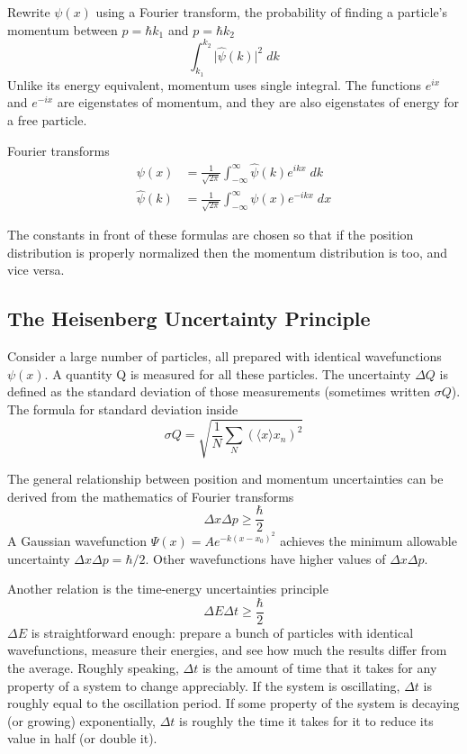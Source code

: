 \documentclass[../main.tex]{subfiles}
\begin{document}
Rewrite $\psi(x)$ using a Fourier transform, the probability of finding a particle's momentum between $p = \hbar k_1$ and $p = \hbar k_2$
\begin{equation*}
    \int_{k_1}^{k_2} \big| \hat{\psi}(k) \Big|^2\;dk
\end{equation*}
Unlike its energy equivalent, momentum uses single integral. The functions $e^{ix}$ and $e^{-ix}$ are eigenstates of momentum, and they are also eigenstates of energy for a free particle. 

Fourier transforms
\begin{align*}
    \psi(x)&= \frac{1}{\sqrt{2\pi}} \int_{-\infty}^{\infty}\hat{\psi}(k) e^{ikx}\;dk\\
    \hat{\psi}(k)&= \frac{1}{\sqrt{2\pi}} \int_{-\infty}^{\infty}\psi(x) e^{-ikx}\;dx
\end{align*}

The constants in front of these formulas are chosen so that if the position distribution is properly normalized then the momentum distribution is too, and vice versa.

\subsection*{The Heisenberg Uncertainty Principle}
Consider a large number of particles, all prepared with identical wavefunctions $\psi (x)$. A quantity Q is measured for all these particles. The uncertainty $\Delta Q$ is defined as the standard deviation of those measurements (sometimes written $\sigma Q$). The formula for standard deviation inside
\begin{equation*}
    \sigma Q=\sqrt{\frac{1}{N}\sum_{N}^{}(\langle x\rangle x_n)^2}
\end{equation*}

The general relationship between position and momentum uncertainties can be derived from
the mathematics of Fourier transforms
\begin{equation*}
    \Delta x \Delta p \geq \frac{\hbar}{2}
\end{equation*}
A Gaussian wavefunction $\Psi (x) = A e^{-k(x-x_0)^2}$ achieves the minimum allowable uncertainty $\Delta x \Delta p = \hbar/2$. Other wavefunctions have higher values of $\Delta x \Delta p$.

Another relation is the time-energy uncertainties principle
\begin{equation*}
    \Delta E \Delta t \geq \frac{\hbar}{2}
\end{equation*}
$\Delta E$ is straightforward enough: prepare a bunch of particles with identical wavefunctions, measure their energies, and see how much the results differ from the average. Roughly speaking, $\Delta t$ is the amount of time that it takes for any property of a system to change appreciably. If the system is oscillating, $\Delta t$ is roughly equal to the oscillation period. If some property of the system is decaying (or growing) exponentially, $\Delta t$ is roughly the time it takes for it to reduce its value in half (or double it).
\end{document}

